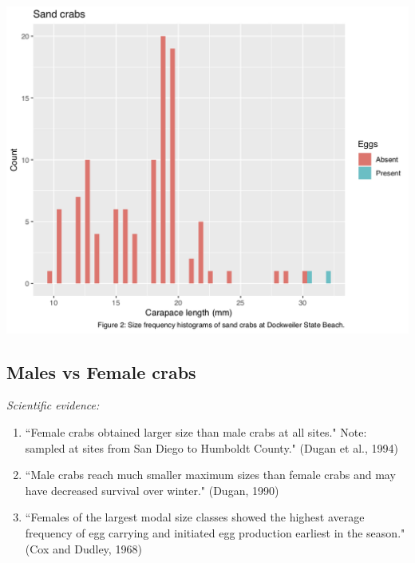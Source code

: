 \documentclass[11pt]{article}
\begin{document}
\paragraph{}
\centerline{\includegraphics[scale=0.35]{Figure2}}

\subsection{Males vs Female crabs}
{\it Scientific evidence:}
\begin{enumerate}
	\item ``Female crabs obtained larger size than male crabs at all sites." Note: sampled at sites from San Diego to Humboldt County." (Dugan et al., 1994)
	\item ``Male crabs reach much smaller maximum sizes than female crabs and may have decreased survival over winter." (Dugan, 1990)
	\item ``Females of the largest modal size classes showed the highest average frequency of egg carrying and initiated egg production earliest in the season." (Cox and Dudley, 1968)
\end{enumerate}
\end{document}

